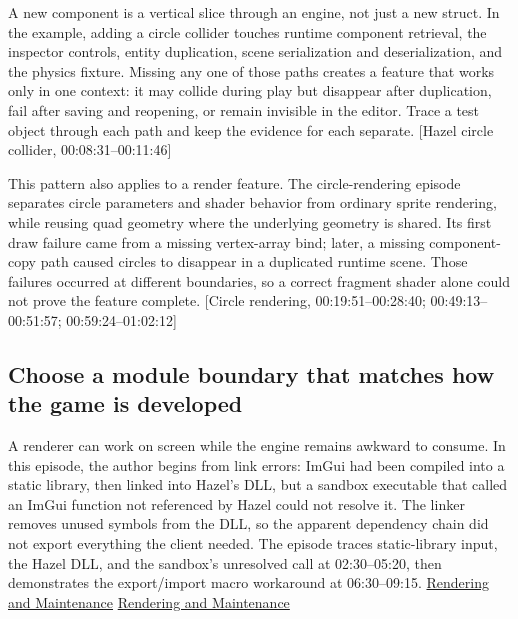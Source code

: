 A new component is a vertical slice through an engine, not just a new struct. In the example, adding a circle collider touches runtime component retrieval, the inspector controls, entity duplication, scene serialization and deserialization, and the physics fixture. Missing any one of those paths creates a feature that works only in one context: it may collide during play but disappear after duplication, fail after saving and reopening, or remain invisible in the editor. Trace a test object through each path and keep the evidence for each separate. {[}Hazel circle collider, 00:08:31--00:11:46{]}

This pattern also applies to a render feature. The circle-rendering episode separates circle parameters and shader behavior from ordinary sprite rendering, while reusing quad geometry where the underlying geometry is shared. Its first draw failure came from a missing vertex-array bind; later, a missing component-copy path caused circles to disappear in a duplicated runtime scene. Those failures occurred at different boundaries, so a correct fragment shader alone could not prove the feature complete. {[}Circle rendering, 00:19:51--00:28:40; 00:49:13--00:51:57; 00:59:24--01:02:12{]}

\subsection{Choose a module boundary that matches how the game is developed}\label{05-engine-i-ch013-choose-a-module-boundary-that-matches-how-the-game-is-developed}

\hypertarget{05-engine-i-ch013-choose-a-module-boundary-that-matches-how-the-game-is-developed}{}

A renderer can work on screen while the engine remains awkward to consume. In this episode, the author begins from link errors: ImGui had been compiled into a static library, then linked into Hazel's DLL, but a sandbox executable that called an ImGui function not referenced by Hazel could not resolve it. The linker removes unused symbols from the DLL, so the apparent dependency chain did not export everything the client needed. The episode traces static-library input, the Hazel DLL, and the sandbox's unresolved call at 02:30--05:20, then demonstrates the export/import macro workaround at 06:30--09:15. \href{https://www.youtube.com/watch?v=695SyEyFwWU&t=150s}{Rendering and Maintenance} \href{https://www.youtube.com/watch?v=695SyEyFwWU&t=390s}{Rendering and Maintenance}

